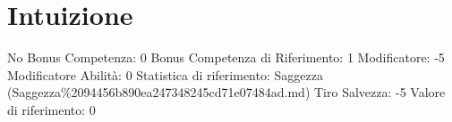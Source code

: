 \section{Intuizione}\label{intuizione}

\begin{description}
\tightlist
\item[Tags: ABI]
No Bonus Competenza: 0 Bonus Competenza di Riferimento: 1 Modificatore:
-5 Modificatore Abilità: 0 Statistica di riferimento: Saggezza
(Saggezza\%2094456b890ea247348245cd71e07484ad.md) Tiro Salvezza: -5
Valore di riferimento: 0
\end{description}
